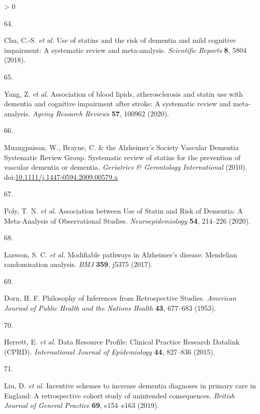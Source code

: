\documentclass[a4paper, twoside]{templates/ociamthesis}
\newlength{\cslhangindent}
\newlength{\csllabelwidth}
\newenvironment{CSLReferences}[3] %
 {%
  \setlength{\parindent}{0pt}
  \ifodd #1 \everypar{\setlength{\hangindent}{\cslhangindent}}\ignorespaces\fi
  \ifnum #2 > 0
  \setlength{\parskip}{#2\baselineskip}
  \fi
 }%
 {}
\newcommand{\CSLLeftMargin}[1]{\parbox[t]{\maxof{\widthof{#1}}{\csllabelwidth}}{#1}}
\newcommand{\CSLRightInline}[1]{\parbox[t]{\linewidth - \csllabelwidth}{#1}}
\begin{document}
\begin{CSLReferences}{0}{0}
\leavevmode\hypertarget{ref-chu2018b}{}%
\CSLLeftMargin{64. }
\CSLRightInline{Chu, C.-S. \emph{et al.} Use of statins and the risk of dementia and mild cognitive impairment: {A} systematic review and meta-analysis. \emph{Scientific Reports} \textbf{8}, 5804 (2018).}

\leavevmode\hypertarget{ref-yang2020}{}%
\CSLLeftMargin{65. }
\CSLRightInline{Yang, Z. \emph{et al.} Association of blood lipids, atherosclerosis and statin use with dementia and cognitive impairment after stroke: {A} systematic review and meta-analysis. \emph{Ageing Research Reviews} \textbf{57}, 100962 (2020).}

\leavevmode\hypertarget{ref-muangpaisan2010}{}%
\CSLLeftMargin{66. }
\CSLRightInline{Muangpaisan, W., Brayne, C. \& the Alzheimer's Society Vascular Dementia Systematic Review Group. Systematic review of statins for the prevention of vascular dementia or dementia. \emph{Geriatrics \& Gerontology International} (2010). doi:\href{https://doi.org/10.1111/j.1447-0594.2009.00579.x}{10.1111/j.1447-0594.2009.00579.x}}

\leavevmode\hypertarget{ref-poly2020b}{}%
\CSLLeftMargin{67. }
\CSLRightInline{Poly, T. N. \emph{et al.} Association between {Use} of {Statin} and {Risk} of {Dementia}: {A Meta}-{Analysis} of {Observational Studies}. \emph{Neuroepidemiology} \textbf{54}, 214--226 (2020).}

\leavevmode\hypertarget{ref-larsson2017a}{}%
\CSLLeftMargin{68. }
\CSLRightInline{Larsson, S. C. \emph{et al.} Modifiable pathways in {Alzheimer}'s disease: {Mendelian} randomisation analysis. \emph{BMJ} \textbf{359}, j5375 (2017).}

\leavevmode\hypertarget{ref-dorn1953}{}%
\CSLLeftMargin{69. }
\CSLRightInline{Dorn, H. F. Philosophy of {Inferences} from {Retrospective Studies}. \emph{American Journal of Public Health and the Nations Health} \textbf{43}, 677--683 (1953).}

\leavevmode\hypertarget{ref-herrett2015}{}%
\CSLLeftMargin{70. }
\CSLRightInline{Herrett, E. \emph{et al.} Data {Resource Profile}: {Clinical Practice Research Datalink} ({CPRD}). \emph{International Journal of Epidemiology} \textbf{44}, 827--836 (2015).}

\leavevmode\hypertarget{ref-liu2019}{}%
\CSLLeftMargin{71. }
\CSLRightInline{Liu, D. \emph{et al.} Incentive schemes to increase dementia diagnoses in primary care in {England}: A retrospective cohort study of unintended consequences. \emph{British Journal of General Practice} \textbf{69}, e154--e163 (2019).}


\end{CSLReferences}
\end{document}
